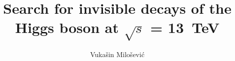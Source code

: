 \documentclass[a4paper,12pt,twoside]{report}
\begin{document}
\title{\Large {\bf Search for invisible decays of the Higgs boson at $\sqrt{s}$ = 13~TeV}\\
 \vspace*{6mm}
}

\author{\large Vuka\v sin Milo\v sevi\' c}



\maketitle
\preface







\body


                 
                  
\end{document}
